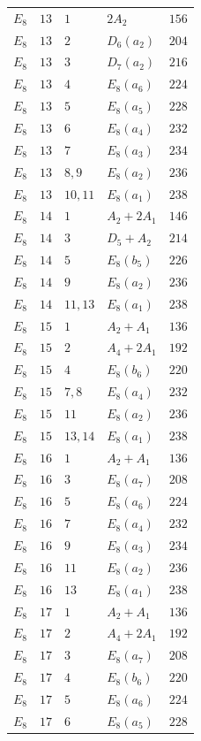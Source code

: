 \documentclass[11pt,a4paper]{amsart}
\numberwithin{equation}{section}
\theoremstyle{definition}
\theoremstyle{remark}
\begin{document}
{\begin{longtable}{@{}p{}p{}p{}p{}p{}@{}}
$E_{8}$&$13$&$1$&$2A_{2}$&$156$\\
$E_{8}$&$13$&$2$&$D_{6}(a_{2})$&$204$\\
$E_{8}$&$13$&$3$&$D_{7}(a_{2})$&$216$\\
$E_{8}$&$13$&$4$&$E_{8}(a_{6})$&$224$\\
$E_{8}$&$13$&$5$&$E_{8}(a_{5})$&$228$\\
$E_{8}$&$13$&$6$&$E_{8}(a_{4})$&$232$\\
$E_{8}$&$13$&$7$&$E_{8}(a_{3})$&$234$\\
$E_{8}$&$13$&$8,9$&$E_{8}(a_{2})$&$236$\\
$E_{8}$&$13$&$10,11$&$E_{8}(a_{1})$&$238$\\
$E_{8}$&$14$&$1$&$A_{2}+2A_{1}$&$146$\\
$E_{8}$&$14$&$3$&$D_{5}+A_{2}$&$214$\\
$E_{8}$&$14$&$5$&$E_{8}(b_{5})$&$226$\\
$E_{8}$&$14$&$9$&$E_{8}(a_{2})$&$236$\\
$E_{8}$&$14$&$11,13$&$E_{8}(a_{1})$&$238$\\
$E_{8}$&$15$&$1$&$A_{2}+A_{1}$&$136$\\
$E_{8}$&$15$&$2$&$A_{4}+2A_{1}$&$192$\\
$E_{8}$&$15$&$4$&$E_{8}(b_{6})$&$220$\\
$E_{8}$&$15$&$7,8$&$E_{8}(a_{4})$&$232$\\
$E_{8}$&$15$&$11$&$E_{8}(a_{2})$&$236$\\
$E_{8}$&$15$&$13,14$&$E_{8}(a_{1})$&$238$\\
$E_{8}$&$16$&$1$&$A_{2}+A_{1}$&$136$\\
$E_{8}$&$16$&$3$&$E_{8}(a_{7})$&$208$\\
$E_{8}$&$16$&$5$&$E_{8}(a_{6})$&$224$\\
$E_{8}$&$16$&$7$&$E_{8}(a_{4})$&$232$\\
$E_{8}$&$16$&$9$&$E_{8}(a_{3})$&$234$\\
$E_{8}$&$16$&$11$&$E_{8}(a_{2})$&$236$\\
$E_{8}$&$16$&$13$&$E_{8}(a_{1})$&$238$\\
$E_{8}$&$17$&$1$&$A_{2}+A_{1}$&$136$\\
$E_{8}$&$17$&$2$&$A_{4}+2A_{1}$&$192$\\
$E_{8}$&$17$&$3$&$E_{8}(a_{7})$&$208$\\
$E_{8}$&$17$&$4$&$E_{8}(b_{6})$&$220$\\
$E_{8}$&$17$&$5$&$E_{8}(a_{6})$&$224$\\
$E_{8}$&$17$&$6$&$E_{8}(a_{5})$&$228$\\

\end{longtable}}
\end{document}
